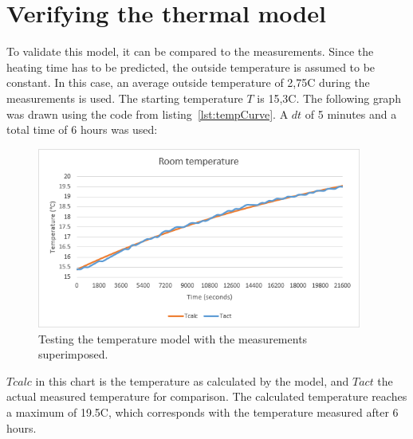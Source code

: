 \documentclass[12pt,a4paper,final]{report}
\begin{document}
\section{Verifying the thermal model}
To validate this model, it can be compared to the measurements. Since the heating time has to be predicted, the outside temperature is assumed to be constant. In this case, an average outside temperature of 2,75\degree{}C during the measurements is used. The starting temperature $T$ is 15,3\degree{}C. The following graph was drawn using the code from listing~\ref{lst:tempCurve}. A $dt$ of 5 minutes and a total time of 6 hours was used:
\begin{figure}[H]
  \begin{center}
      \includegraphics[width=0.95\textwidth]{GraphModelTest-compare}
  \end{center}
  \caption{Testing the temperature model with the measurements superimposed.}
\end{figure}
$Tcalc$ in this chart is the temperature as calculated by the model, and $Tact$ the actual measured temperature for comparison. The calculated temperature reaches a maximum of 19.5\degree{}C, which corresponds with the temperature measured after 6 hours.
\end{document}

